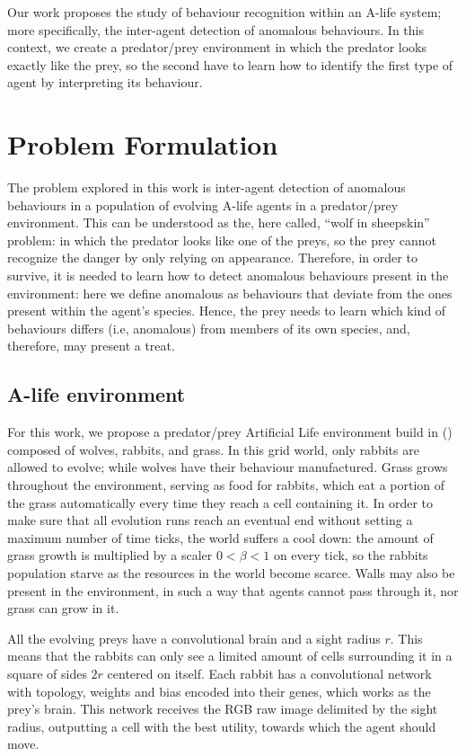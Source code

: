 \documentclass[letterpaper]{article}
\newcommand{\citea}[1]{\citeauthor{#1} (\citeyear{#1})}
\numberwithin{equation}{section}
\numberwithin{theorem}{section}
\numberwithin{lemma}{section}
\numberwithin{df}{section}
\begin{document}
Our work proposes the study of behaviour recognition within an A-life system; more specifically, the inter-agent detection of anomalous behaviours. In this context, we create a predator/prey environment in which the predator looks exactly like the prey, so the second have to learn how to identify the first type of agent by interpreting its behaviour. 

\section{Problem Formulation}

The problem explored in this work is inter-agent detection of anomalous behaviours in a population of evolving A-life agents in a predator/prey environment. This can be understood as the, here called, ``wolf in sheepskin'' problem: in which the predator looks like one of the preys, so the prey cannot recognize the danger by only relying on appearance. Therefore, in order to survive, it is needed to learn how to detect anomalous behaviours present in the environment: here we define anomalous as behaviours that deviate from the ones present within the agent's species. Hence, the prey needs to learn which kind of behaviours differs (i.e, anomalous) from members of its own species, and, therefore, may present a treat.

\subsection{A-life environment}

For this work, we propose a predator/prey Artificial Life environment build in \citea{MATLAB:2018a} composed of wolves, rabbits, and grass. In this grid world, only rabbits are allowed to evolve; while wolves have their behaviour manufactured. Grass grows throughout the environment, serving as food for rabbits, which eat a portion of the grass automatically every time they reach a cell containing it. In order to make sure that all evolution runs reach an eventual end without setting a maximum number of time ticks, the world suffers a cool down: the amount of grass growth is multiplied by a scaler $0 < \beta < 1$ on every tick, so the rabbits population starve as the resources in the world become scarce. Walls may also be present in the environment, in such a way that agents cannot pass through it, nor grass can grow in it.

All the evolving preys have a convolutional brain and a sight radius $r$. This means that the rabbits can only see a limited amount of cells surrounding it in a square of sides $2r$ centered on itself. Each rabbit has a convolutional network with topology, weights and bias encoded into their genes, which works as the prey's brain. This network receives the RGB raw image delimited by the sight radius, outputting a cell with the best utility, towards which the agent should move.
\end{document}
